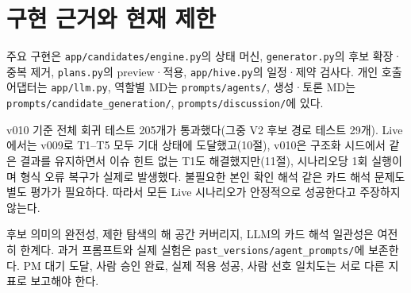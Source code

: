 \documentclass[11pt,a4paper]{article}
\begin{document}
\section{구현 근거와 현재 제한}
주요 구현은 \texttt{app/candidates/engine.py}의 상태 머신, \texttt{generator.py}의 후보 확장·중복 제거, \texttt{plans.py}의 preview·적용, \texttt{app/hive.py}의 일정·제약 검사다. 개인 호출 어댑터는 \texttt{app/llm.py}, 역할별 MD는 \texttt{prompts/agents/}, 생성·토론 MD는 \texttt{prompts/candidate\_generation/}, \texttt{prompts/discussion/}에 있다.

v010 기준 전체 회귀 테스트 205개가 통과했다(그중 V2 후보 경로 테스트 29개). Live에서는 v009로 T1--T5 모두 기대 상태에 도달했고(10절), v010은 구조화 시드에서 같은 결과를 유지하면서 이슈 힌트 없는 T1도 해결했지만(11절), 시나리오당 1회 실행이며 형식 오류 복구가 실제로 발생했다. 불필요한 본인 확인 해석 같은 카드 해석 문제도 별도 평가가 필요하다. 따라서 모든 Live 시나리오가 안정적으로 성공한다고 주장하지 않는다.

후보 의미의 완전성, 제한 탐색의 해 공간 커버리지, LLM의 카드 해석 일관성은 여전히 한계다. 과거 프롬프트와 실제 실험은 \texttt{past\_versions/agent\_prompts/}에 보존한다. PM 대기 도달, 사람 승인 완료, 실제 적용 성공, 사람 선호 일치도는 서로 다른 지표로 보고해야 한다.
\end{document}
